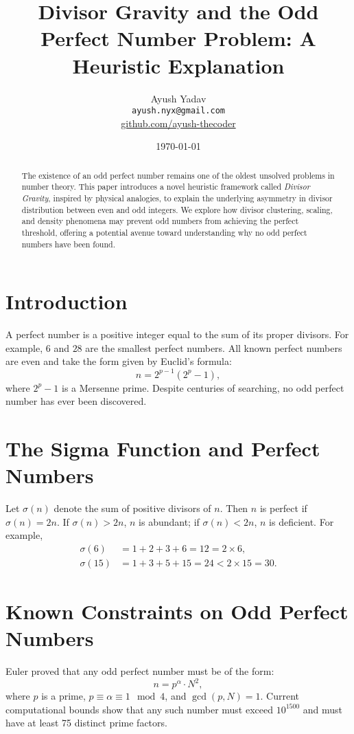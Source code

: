 \documentclass[12pt]{article}
\title{Divisor Gravity and the Odd Perfect Number Problem: A Heuristic Explanation}
\author{Ayush Yadav\\
\texttt{ayush.nyx@gmail.com}\\
\href{https://github.com/ayush-thecoder}{github.com/ayush-thecoder}}
\date{\today}
\begin{document}
\maketitle

\begin{abstract}
The existence of an odd perfect number remains one of the oldest unsolved problems in number theory. This paper introduces a novel heuristic framework called \emph{Divisor Gravity}, inspired by physical analogies, to explain the underlying asymmetry in divisor distribution between even and odd integers. We explore how divisor clustering, scaling, and density phenomena may prevent odd numbers from achieving the perfect threshold, offering a potential avenue toward understanding why no odd perfect numbers have been found.
\end{abstract}

\section{Introduction}
A perfect number is a positive integer equal to the sum of its proper divisors. For example, $6$ and $28$ are the smallest perfect numbers. All known perfect numbers are even and take the form given by Euclid's formula:
\begin{equation}
n = 2^{p-1}(2^p - 1),
\end{equation}
where $2^p - 1$ is a Mersenne prime. Despite centuries of searching, no odd perfect number has ever been discovered.

\section{The Sigma Function and Perfect Numbers}
Let $\sigma(n)$ denote the sum of positive divisors of $n$. Then $n$ is perfect if $\sigma(n) = 2n$. If $\sigma(n) > 2n$, $n$ is abundant; if $\sigma(n) < 2n$, $n$ is deficient. For example,
\begin{align*}
\sigma(6) &= 1 + 2 + 3 + 6 = 12 = 2 \times 6,\\
\sigma(15) &= 1 + 3 + 5 + 15 = 24 < 2 \times 15 = 30.
\end{align*}

\section{Known Constraints on Odd Perfect Numbers}
Euler proved that any odd perfect number must be of the form:
\begin{equation}
n = p^{\alpha} \cdot N^2,
\end{equation}
where $p$ is a prime, $p \equiv \alpha \equiv 1 \mod 4$, and $\gcd(p, N) = 1$. Current computational bounds show that any such number must exceed $10^{1500}$ and must have at least 75 distinct prime factors.
\end{document}
